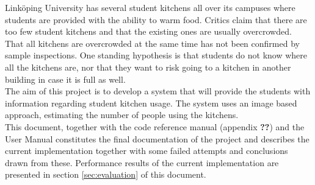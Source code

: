 Linköping University has several student kitchens all over its campuses where students are provided with the ability to warm food. Critics claim that there are too few student kitchens and that the existing ones are usually overcrowded. That all kitchens are overcrowded at the same time has not been confirmed by sample inspections. One standing hypothesis is that students do not know where all the kitchens are, nor that they want to risk going to a kitchen in another building in case it is full as well.\\

The aim of this project is to develop a system that will provide the students with information regarding student kitchen usage. The system uses an image based approach, estimating the number of people using the kitchens.\\

This document, together with the code reference manual (appendix \textbf{??}) and the User Manual constitutes the final documentation of the project and describes the current implementation together with some failed attempts and conclusions drawn from these. Performance results of the current implementation are presented in section \ref{sec:evaluation} of this document.
